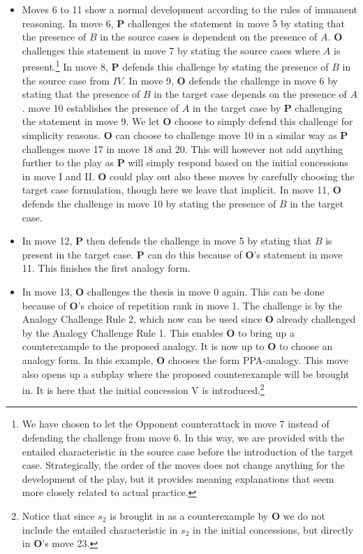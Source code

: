 \begin{itemize}
				\item Moves 6 to 11 show a normal development according to the rules of immanent reasoning. In move 6, \textbf{P} challenges the statement in move 5 by stating that the presence of $B$ in the source cases is dependent on the presence of $A$. \textbf{O} challenges this statement in move 7 by stating the source cases where $A$ is present.\footnote{We have chosen to let the Opponent counterattack in move 7 instead of defending the challenge from move 6. In this way, we are provided with the entailed characteristic in the source case before the introduction of the target case. Strategically, the order of the moves does not change anything for the development of the play, but it provides meaning explanations that seem more closely related to actual practice.} In move 8, \textbf{P} defends this challenge by stating the presence of $B$ in the source case from $IV$. In move 9, \textbf{O} defends the challenge in move 6 by stating that the presence of $B$ in the target case depends on the presence of $A$. move 10 establishes the presence of $A$ in the target case by \textbf{P} challenging the statement in move 9. We let \textbf{O} choose to simply defend this challenge for simplicity reasons. \textbf{O} can choose to challenge move 10 in a similar way as \textbf{P} challenges move 17 in move 18 and 20. This will however not add anything further to the play as \textbf{P} will simply respond based on the initial concessions in move I and II. 
				 \textbf{O} could play out also these moves by carefully choosing the target case formulation, though here we leave that implicit. In move 11, \textbf{O} defends the challenge in move 10 by stating the presence of $B$ in the target case. 
				\item In move 12, \textbf{P} then defends the challenge in move 5 by stating that $B$ is present in the target case. \textbf{P} can do this because of \textbf{O}'s statement in move 11. This finishes the first analogy form. 
				\item In move 13, \textbf{O} challenges the thesis in move 0 again. This can be done because of \textbf{O}'s choice of repetition rank in move 1. The challenge is by the Analogy Challenge Rule 2, which now can be used since \textbf{O} already challenged by the Analogy Challenge Rule 1. This enables \textbf{O} to bring up a counterexample to the proposed analogy. It is now up to \textbf{O} to choose an analogy form. In this example, \textbf{O} chooses the form PPA-analogy. This move also opens up a subplay where the proposed counterexample will be brought in. It is here that the initial concession V is introduced.\footnote{Notice that since $s_2$ is brought in as a counterexample by \textbf{O} we do not include the entailed characteristic in $s_2$ in the initial concessions, but directly in \textbf{O}'s move 23.} 

\end{itemize}
